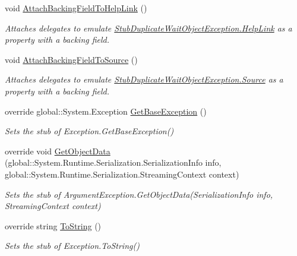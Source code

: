 \begin{DoxyCompactItemize}
void \hyperlink{class_system_1_1_fakes_1_1_stub_duplicate_wait_object_exception_ab93751979d89234e81ef1ea554da15d8}{Attach\-Backing\-Field\-To\-Help\-Link} ()
\begin{DoxyCompactList}\small\item\em Attaches delegates to emulate \hyperlink{class_system_1_1_fakes_1_1_stub_duplicate_wait_object_exception_a4c56a39d575aca2704e163035d7330d8}{Stub\-Duplicate\-Wait\-Object\-Exception.\-Help\-Link} as a property with a backing field.\end{DoxyCompactList}\item 
void \hyperlink{class_system_1_1_fakes_1_1_stub_duplicate_wait_object_exception_ab4a8747f5b66300818e6c16c99320925}{Attach\-Backing\-Field\-To\-Source} ()
\begin{DoxyCompactList}\small\item\em Attaches delegates to emulate \hyperlink{class_system_1_1_fakes_1_1_stub_duplicate_wait_object_exception_af3020aa0560985e0bae5f55da5e9101d}{Stub\-Duplicate\-Wait\-Object\-Exception.\-Source} as a property with a backing field.\end{DoxyCompactList}\item 
override global\-::\-System.\-Exception \hyperlink{class_system_1_1_fakes_1_1_stub_duplicate_wait_object_exception_ac8a9e12d4a392ace4995e6577add8787}{Get\-Base\-Exception} ()
\begin{DoxyCompactList}\small\item\em Sets the stub of Exception.\-Get\-Base\-Exception()\end{DoxyCompactList}\item 
override void \hyperlink{class_system_1_1_fakes_1_1_stub_duplicate_wait_object_exception_abd215dd81cfcdf296a61cf07d2d13cdd}{Get\-Object\-Data} (global\-::\-System.\-Runtime.\-Serialization.\-Serialization\-Info info, global\-::\-System.\-Runtime.\-Serialization.\-Streaming\-Context context)
\begin{DoxyCompactList}\small\item\em Sets the stub of Argument\-Exception.\-Get\-Object\-Data(\-Serialization\-Info info, Streaming\-Context context)\end{DoxyCompactList}\item 
override string \hyperlink{class_system_1_1_fakes_1_1_stub_duplicate_wait_object_exception_ae4893d0bf23f88c73d934e87cdc60dce}{To\-String} ()
\begin{DoxyCompactList}\small\item\em Sets the stub of Exception.\-To\-String()\end{DoxyCompactList}\end{DoxyCompactItemize}
